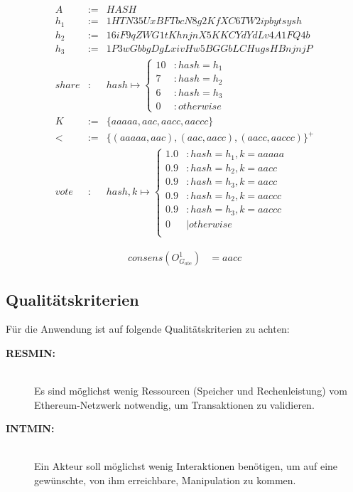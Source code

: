 \documentclass[a4paper,12pt]{report}
\begin{document}
\begin{eqnarray}
  A &:=& HASH\\
  h_1 &:=& 1HTN35UxBFTbcN8g2KfXC6TW2ipbytsysh\\
  h_2 &:=& 16iF9qZWG1tKhnjnX5KKCYdYdLv4A1FQ4b\\
  h_3 &:=& 1P3wGbbgDgLxivHw5BGGbLCHugsHBnjnjP\\
  share&:& hash\mapsto 
  \begin{cases}
    10 &: hash = h_1 \\
    7 &: hash = h_2 \\
    6 &: hash = h_3 \\
    0 &: otherwise
  \end{cases} \\
  K &:=& \{aaaaa, aac, aacc, aaccc\} \\
  <&:=&\{(aaaaa,aac),(aac,aacc),(aacc,aaccc)\}^+\\
  vote&:& hash,k\mapsto
  \begin{cases}
    1.0 &: hash = h_1, k = aaaaa \\
    0.9 &: hash = h_2, k = aacc \\
    0.9 &: hash = h_3, k = aacc \\
    0.9 &: hash = h_2, k = aaccc \\
    0.9 &: hash = h_3, k = aaccc \\
    0 &| otherwise \\
  \end{cases}
\end{eqnarray}
\label{daoExDef}

\begin{eqnarray}
consens(O_{G_{abc}}^1) &= aacc
\end{eqnarray}


\subsection{Qualitätskriterien}
\label{quality}

Für die Anwendung ist auf folgende Qualitätskriterien zu achten:

\begin{description} 
  \item[\textbf{RESMIN:}]\hfill \\
    Es sind möglichst wenig Ressourcen (Speicher und Rechenleistung) vom Ethereum-Netzwerk notwendig, um Transaktionen zu validieren.
  \item[\textbf{INTMIN:}]\hfill \\
    Ein Akteur soll möglichst wenig Interaktionen benötigen, um auf eine gewünschte, von ihm erreichbare, Manipulation zu kommen.
\end{description}
\end{document}
